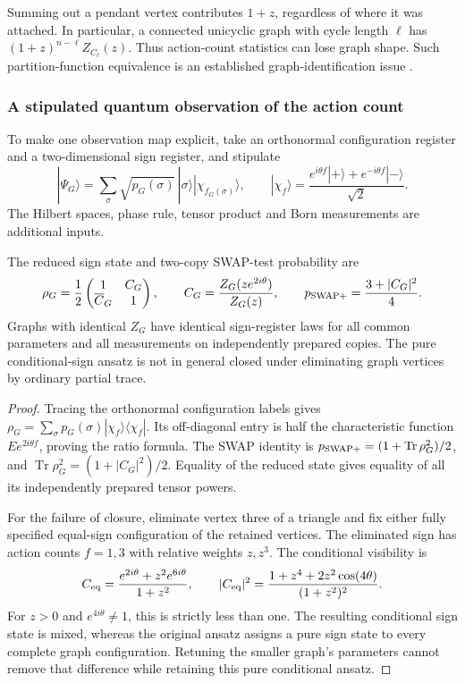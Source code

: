 Summing out a pendant vertex contributes \(1+z\), regardless of where
it was attached.  In particular, a connected unicyclic graph with
cycle length \(\ell\) has
\((1+z)^{n-\ell}Z_{C_\ell}(z)\).
Thus action-count statistics can lose graph shape.  Such
partition-function equivalence is an established graph-identification
issue \cite{fin:ising}.

\subsubsection{A stipulated quantum observation of the action count}

To make one observation map explicit, take an orthonormal configuration
register and a two-dimensional sign register, and stipulate
\[
 |\Psi_G\rangle=\sum_\sigma\sqrt{p_G(\sigma)}\,|\sigma\rangle
          |\chi_{f_G(\sigma)}\rangle,\qquad
 |\chi_f\rangle=
 \frac{e^{i\theta f}|+\rangle+e^{-i\theta f}|-\rangle}{\sqrt2}.
\]
The Hilbert spaces, phase rule, tensor product and Born measurements are
additional inputs.

\begin{proposition}
\label{fin:graph-readout}
The reduced sign state and two-copy SWAP-test probability are
\[
 \rho_G=\frac12\begin{pmatrix}1&C_G\\\overline C_G&1\end{pmatrix},
 \qquad C_G=\frac{Z_G(ze^{2i\theta})}{Z_G(z)},\qquad
 p_{\rm SWAP+}=\frac{3+|C_G|^2}{4}.
\]
Graphs with identical \(Z_G\) have identical sign-register laws for
all common parameters and all measurements on independently prepared
copies.  The pure conditional-sign ansatz is not in general closed
under eliminating graph vertices by ordinary partial trace.
\end{proposition}
\begin{proof}
Tracing the orthonormal configuration labels gives
\(\rho_G=\sum_\sigma p_G(\sigma)|\chi_f\rangle\langle\chi_f|\).
Its off-diagonal entry is half the characteristic function
\(E e^{2i\theta f}\), proving the ratio formula.
The SWAP identity is
\(p_{\rm SWAP+}=(1+\operatorname{Tr}\rho_G^2)/2\), and
\(\operatorname{Tr}\rho_G^2=(1+|C_G|^2)/2\).
Equality of the reduced state gives equality of all its independently
prepared tensor powers.

For the failure of closure, eliminate vertex three of a triangle and
fix either fully specified equal-sign configuration of the retained
vertices.  The eliminated sign has action counts \(f=1,3\) with
relative weights \(z,z^3\).  The conditional visibility is
\[
 C_{\rm eq}=\frac{e^{2i\theta}+z^2e^{6i\theta}}{1+z^2},\qquad
 |C_{\rm eq}|^2=
 \frac{1+z^4+2z^2\cos(4\theta)}{(1+z^2)^2}.
\]
For \(z>0\) and \(e^{4i\theta}\ne1\), this is strictly less than one.
The resulting conditional sign state is mixed, whereas the original
ansatz assigns a pure sign state to every complete graph configuration.
Retuning the smaller graph's parameters cannot remove that difference
while retaining this pure conditional ansatz.
\end{proof}


